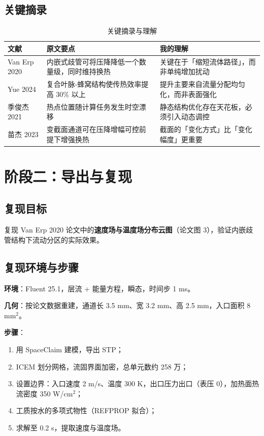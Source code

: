 \documentclass[stage1]{ydzjreport}
\begin{document}
\subsection{关键摘录}

\begin{table}[htbp]
\centering
\caption{关键摘录与理解}
\begin{tabularx}{\textwidth}{@{}Y Y Y@{}}
\toprule
{} 文献 & 原文要点 & 我的理解 \\
\midrule
Van Erp 2020 & 内嵌式歧管可将压降降低一个数量级，同时维持换热 & 关键在于「缩短流体路径」，而非单纯增加扰动 \\
Yue 2024 & 复合叶脉-蜂窝结构使传热效率提高 30\% 以上 & 提升主要来自流量分配均匀化，而非表面强化 \\
季俊杰 2021 & 热点位置随计算任务发生时空漂移 & 静态结构优化存在天花板，必须引入动态调控 \\
苗杰 2023 & 变截面通道可在压降增幅可控前提下增强换热 & 截面的「变化方式」比「变化幅度」更重要 \\
\bottomrule
\end{tabularx}
\end{table}

\section{阶段二：导出与复现}

\subsection{复现目标}

复现 Van Erp 2020 论文中的\textbf{速度场与温度场分布云图}（论文图 3），验证内嵌歧管结构下流动分区的实际效果。

\subsection{复现环境与步骤}

\textbf{环境}：Fluent 25.1，层流 + 能量方程，瞬态，时间步 1 ms。

\textbf{几何}：按论文数据重建，通道长 3.5 mm、宽 3.2 mm、高 2.5 mm，入口面积 8 mm$^2$。

\textbf{步骤}：

\begin{enumerate}
  \item 用 SpaceClaim 建模，导出 STP；
  \item ICEM 划分网格，流固界面加密，总单元数约 258 万；
  \item 设置边界：入口速度 2 m/s、温度 300 K，出口压力出口（表压 0），加热面热流密度 350 W/cm$^2$；
  \item 工质按水的多项式物性（REFPROP 拟合）；
  \item 求解至 0.2 s，提取速度与温度场。
\end{enumerate}
\end{document}
